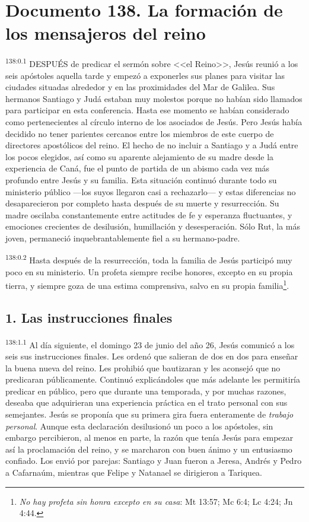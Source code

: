 \chapter{Documento 138. La formación de los mensajeros del reino}
\par 
\textsuperscript{138:0.1} DESPUÉS de predicar el sermón sobre <<el Reino>>, Jesús reunió a los seis apóstoles aquella tarde y empezó a exponerles sus planes para visitar las ciudades situadas alrededor y en las proximidades del Mar de Galilea. Sus hermanos Santiago y Judá estaban muy molestos porque no habían sido llamados para participar en esta conferencia. Hasta ese momento se habían considerado como pertenecientes al círculo interno de los asociados de Jesús. Pero Jesús había decidido no tener parientes cercanos entre los miembros de este cuerpo de directores apostólicos del reino. El hecho de no incluir a Santiago y a Judá entre los pocos elegidos, así como su aparente alejamiento de su madre desde la experiencia de Caná, fue el punto de partida de un abismo cada vez más profundo entre Jesús y su familia. Esta situación continuó durante todo su ministerio público ---los suyos llegaron casi a rechazarlo--- y estas diferencias no desaparecieron por completo hasta después de su muerte y resurrección. Su madre oscilaba constantemente entre actitudes de fe y esperanza fluctuantes, y emociones crecientes de desilusión, humillación y desesperación. Sólo Rut, la más joven, permaneció inquebrantablemente fiel a su hermano-padre.

\par 
\textsuperscript{138:0.2} Hasta después de la resurrección, toda la familia de Jesús participó muy poco en su ministerio. Un profeta siempre recibe honores, excepto en su propia tierra, y siempre goza de una estima comprensiva, salvo en su propia familia\footnote{\textit{No hay profeta sin honra excepto en su casa}: Mt 13:57; Mc 6:4; Lc 4:24; Jn 4:44.}.

\section*{1. Las instrucciones finales}
\par 
\textsuperscript{138:1.1} Al día siguiente, el domingo 23 de junio del año 26, Jesús comunicó a los seis sus instrucciones finales. Les ordenó que salieran de dos en dos para enseñar la buena nueva del reino. Les prohibió que bautizaran y les aconsejó que no predicaran públicamente. Continuó explicándoles que más adelante les permitiría predicar en público, pero que durante una temporada, y por muchas razones, deseaba que adquirieran una experiencia práctica en el trato personal con sus semejantes. Jesús se proponía que su primera gira fuera enteramente de \textit{trabajo personal}. Aunque esta declaración desilusionó un poco a los apóstoles, sin embargo percibieron, al menos en parte, la razón que tenía Jesús para empezar así la proclamación del reino, y se marcharon con buen ánimo y un entusiasmo confiado. Los envió por parejas: Santiago y Juan fueron a Jeresa, Andrés y Pedro a Cafarnaúm, mientras que Felipe y Natanael se dirigieron a Tariquea.

